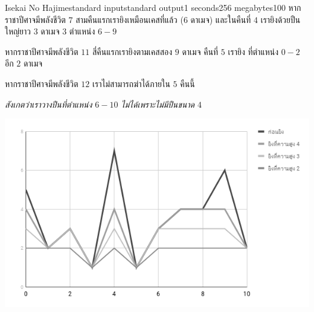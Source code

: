 \documentclass[11pt,a4paper]{article}
\begin{document}
\begin{problem}{Isekai No Hajime}{standard input}{standard output}{1 seconds}{256 megabytes}{100}
หากราชาปีศาจมีพลังชีวิต $7$ สามคืนแรกเรายิงเหมือนเคสที่แล้ว ($6$ ดาเมจ) และในคืนที่ $4$ เรายิงด้วยปืนใหญ่ยาว $3$ ดาเมจ $3$ ตำแหน่ง $6 - 9$

หากราชาปีศาจมีพลังชีวิต $11$ สี่คืนแรกเรายิงตามเคสสอง $9$ ดาเมจ คืนที่ $5$ เรายิง ที่ตำแหน่ง $0 - 2$ อีก $2$ ดาเมจ

หากราชาปีศาจมีพลังชีวิต $12$ เราไม่สามารถฆ่าได้ภายใน $5$ คืนนี้

\textit{สังเกตว่าเราวางปืนที่ตำแหน่ง $6 - 10$ ไม่ได้เพราะไม่มีปืนขนาด $4$}

\includegraphics[width=\textwidth]{chart.png}

\end{problem}

\pagebreak
\end{document}
